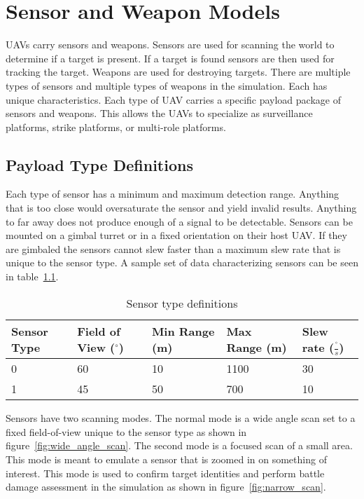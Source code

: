 \chapter{Sensor and Weapon Models}
UAVs carry sensors and weapons.  Sensors are used for scanning the world to determine if a target is present.  If a target is found sensors are then used for tracking the target.  Weapons are used for destroying targets.  There are multiple types of sensors and multiple types of weapons in the simulation.  Each has unique characteristics.  Each type of UAV carries a specific payload package of sensors and weapons.  This allows the UAVs to specialize as surveillance platforms, strike platforms, or multi-role platforms.

\section{Payload Type Definitions}

Each type of sensor has a minimum and maximum detection range.  Anything that is too close would oversaturate the sensor and yield invalid results.  Anything to far away does not produce enough of a signal to be detectable.  Sensors can be mounted on a gimbal turret or in a fixed orientation on their host UAV.  If they are gimbaled the sensors cannot slew faster than a maximum slew rate that is unique to the sensor type. A sample set of data characterizing sensors can be seen in table~\ref{tab:sensorType}.

\begin{table}[H]
	\caption{Sensor type definitions}
	\centering
	\label{tab:sensorType}
	\begin{tabular}{|p{1cm}|p{1.5cm}|p{1cm}|p{1cm}|p{1.5cm}|}
		\hline
		Sensor Type & Field of View ($^{\circ}$) & Min Range (m) & Max Range (m) & Slew rate ($\frac{^{\circ}}{s}$)\\ \hline
		0 & 60 & 10 & 1100 & 30 \\
		1 & 45 & 50 & 700  & 10 \\
		\hline
	\end{tabular}
\end{table}

Sensors have two scanning modes.  The normal mode is a wide angle scan set to a fixed field-of-view unique to the sensor type as shown in figure~\ref{fig:wide_angle_scan}.  The second mode is a focused scan of a small area.  This mode is meant to emulate a sensor that is zoomed in on something of interest.  This mode is used to confirm target identities and perform battle damage assessment in the simulation as shown in figure~\ref{fig:narrow_scan}.

